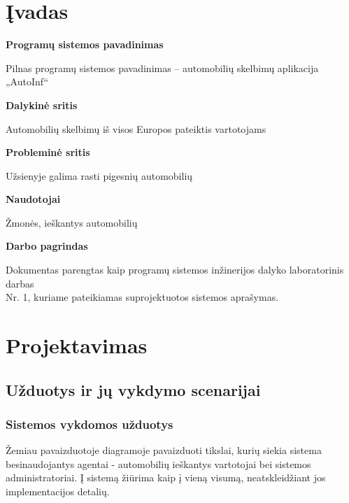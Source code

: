 \documentclass[12pt]{article}
\begin{document}
	\tableofcontents
	\pagebreak

	\section*{Įvadas}
	
	\begin{flushleft}
		\bigbreak\textbf{Programų sistemos pavadinimas}
	\end{flushleft}
	
	Pilnas programų sistemos pavadinimas – automobilių skelbimų aplikacija „AutoInf“ \\
	
	\begin{flushleft}
		\textbf{Dalykinė sritis}
	\end{flushleft}	
	
	Automobilių skelbimų iš visos Europos pateiktis vartotojams  \\
	
	\begin{flushleft}
		\textbf{Probleminė sritis}
	\end{flushleft}
	
	Užsienyje galima rasti pigesnių automobilių \\
	
	\begin{flushleft}
		\textbf{Naudotojai} 
	\end{flushleft}
	
	Žmonės, ieškantys automobilių \\
	
	\begin{flushleft}
		\textbf{Darbo pagrindas}
	\end{flushleft}
	
	Dokumentas parengtas kaip programų sistemos inžinerijos dalyko laboratorinis darbas\\Nr. 1, kuriame pateikiamas suprojektuotos sistemos aprašymas.
	\pagebreak

	\section{Projektavimas}
	\subsection{Užduotys ir jų vykdymo scenarijai}
	\subsubsection{Sistemos vykdomos užduotys}
	Žemiau pavaizduotoje diagramoje pavaizduoti tikslai, kurių siekia sistema besinaudojantys agentai - automobilių ieškantys vartotojai bei sistemos administratoriai. Į sistemą žiūrima kaip į vieną visumą, neatskleidžiant jos implementacijos detalių.
	
\end{document}
